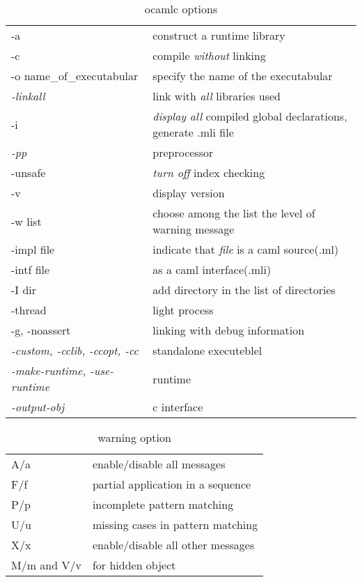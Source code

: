   


\begin{table}
  \centering
  \begin{tabular}{|l|l|}
  \hline
  -a & construct a runtime library \\
  -c & compile \textit{without} linking \\
  -o name\_of\_executabular & specify the name of the executabular \\
 \emph{-linkall} & link with \textit{all} libraries used \\
  -i & \textit{display all } compiled global declarations, generate
  .mli file \\
  \emph{-pp} & preprocessor \\
  -unsafe & \textit{turn off} index checking \\
  -v & display version \\
  -w list & choose among the list the level of warning message \\
  -impl file & indicate that \textit{file} is a caml source(.ml) \\
  -intf file & as a caml interface(.mli) \\
  -I dir & add directory in the list of directories \\
  \hline
  -thread & light process \\
  -g, -noassert & linking  with debug information\\
  \textit{-custom, -cclib, -ccopt, -cc} & standalone executeblel \\
  \textit{-make-runtime, -use-runtime} & runtime \\
  \textit{-output-obj} & c interface \\
  \hline
  \end{tabular}
  \caption{ocamlc options}
  \label{tab:ocamlc_options}
\end{table}

\begin{table}
  \centering
  \begin{tabular}{|l|l|}
    \hline
  A/a & enable/disable all messages \\
  F/f & partial application in a sequence \\
  P/p & incomplete pattern matching \\
  U/u & missing cases in pattern matching \\
  X/x & enable/disable all other messages \\
  M/m and V/v & for hidden object \\
  \hline
  \end{tabular}
  \caption{warning option}
  \label{tab:warning_opt}
\end{table}

